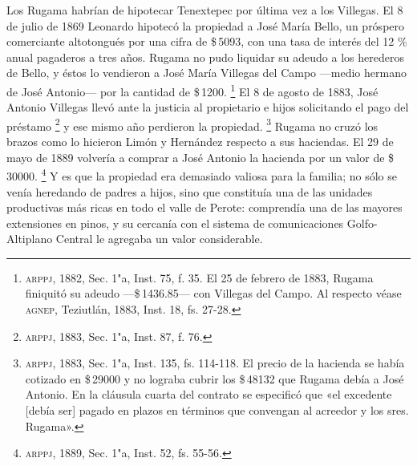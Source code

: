 \documentclass[14pt,twoside,final]{extbook} %
\let\oldfootnote\footnote
\renewcommand\footnote[1]{%
\oldfootnote{\hspace{1mm}#1}}
\begin{document}
Los Rugama habrían de hipotecar Tenextepec por última vez a los Villegas. El 8 de julio de 1869 Leonardo hipotecó la propiedad a José María Bello, un próspero comerciante altotongués por una cifra de \$\,5093, con una tasa de interés del 12 \% anual pagaderos a tres años. Rugama no pudo liquidar su adeudo a los herederos de Bello, y éstos lo vendieron a José María Villegas del Campo ---medio hermano de José Antonio--- por la cantidad de \$\,1200.\footnote{\textsc{arppj}, 1882, Sec. 1"a, Inst. 75, f. 35. El 25 de febrero de 1883, Rugama finiquitó su adeudo ---\$\,1436.85--- con Villegas del Campo. Al respecto véase \textsc{agnep}, Teziutlán, 1883, Inst. 18, fs. 27-28.} El 8 de agosto de 1883, José Antonio Villegas llevó ante la justicia al propietario e hijos solicitando el pago del préstamo\footnote{\textsc{arppj}, 1883, Sec. 1"a, Inst. 87, f. 76.} y ese mismo año perdieron la propiedad.\footnote{\textsc{arppj}, 1883, Sec. 1"a, Inst. 135, fs. 114-118. El precio de la hacienda se había cotizado en \$\,29000 y no lograba cubrir los \$\,48132 que Rugama debía a José Antonio. En la cláusula cuarta del contrato se especificó que «el excedente [debía ser] pagado en plazos en términos que convengan al acreedor y los sres. Rugama».} Rugama no cruzó los brazos como lo hicieron Limón y Hernández respecto a sus haciendas. El 29 de mayo de 1889 volvería a comprar a José Antonio la hacienda por un valor de \$\,30000.\footnote{\textsc{arppj}, 1889, Sec. 1"a, Inst. 52, fs. 55-56.} Y es que la propiedad era demasiado valiosa para la familia; no sólo se venía heredando de padres a hijos, sino que constituía una de las unidades productivas más ricas en todo el valle de Perote: comprendía una de las mayores extensiones en pinos, y su cercanía con el sistema de comunicaciones Golfo-Altiplano Central le agregaba un valor considerable.
\end{document}
